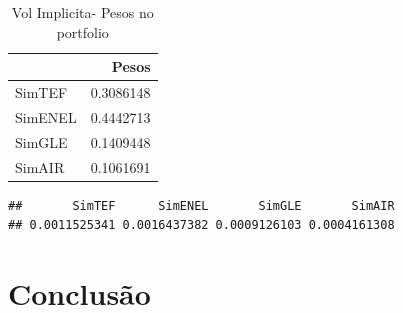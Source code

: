 \documentclass[
  12pt,
  a4paper,
  openany]{book}
\newenvironment{Shaded}{\begin{snugshade}}{\end{snugshade}}
\newcommand{\DataTypeTok}[1]{\textcolor[rgb]{0.13,0.29,0.53}{#1}}
\newcommand{\DecValTok}[1]{\textcolor[rgb]{0.00,0.00,0.81}{#1}}
\newcommand{\FloatTok}[1]{\textcolor[rgb]{0.00,0.00,0.81}{#1}}
\newcommand{\KeywordTok}[1]{\textcolor[rgb]{0.13,0.29,0.53}{\textbf{#1}}}
\newcommand{\NormalTok}[1]{#1}
\newcommand{\OperatorTok}[1]{\textcolor[rgb]{0.81,0.36,0.00}{\textbf{#1}}}
\newcommand{\StringTok}[1]{\textcolor[rgb]{0.31,0.60,0.02}{#1}}
\begin{document}
\normalsize

\begin{table}[!h]

\caption{\label{tab:unnamed-chunk-58}Vol Implicita- Pesos no portfolio}
\centering
\begin{tabular}[t]{lr}
\toprule
  & Pesos\\
\midrule
SimTEF & 0.3086148\\
SimENEL & 0.4442713\\
SimGLE & 0.1409448\\
SimAIR & 0.1061691\\
\bottomrule
\end{tabular}
\end{table}

\scriptsize

\begin{Shaded}
\end{Shaded}

\begin{verbatim}
##       SimTEF      SimENEL       SimGLE       SimAIR 
## 0.0011525341 0.0016437382 0.0009126103 0.0004161308
\end{verbatim}

\begin{Shaded}
\end{Shaded}

\normalsize

\hypertarget{conclusuxe3o}{%
\chapter*{Conclusão}\label{conclusuxe3o}}
\end{document}
